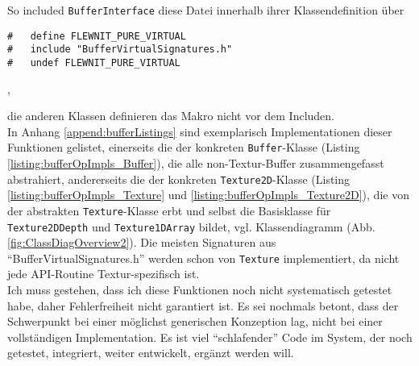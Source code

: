 	So included \lstinline|BufferInterface| diese Datei innerhalb ihrer Klassendefinition über
	\begin{lstlisting}
#	define FLEWNIT_PURE_VIRTUAL
#	include "BufferVirtualSignatures.h"
#	undef FLEWNIT_PURE_VIRTUAL
	\end{lstlisting},
	
	die anderen Klassen definieren das Makro nicht vor dem Includen.\\
	
	In Anhang \ref{append:bufferListings} sind exemplarisch Implementationen dieser Funktionen 
	gelistet, einerseits die der konkreten \lstinline|Buffer|-Klasse (Listing \ref{listing:bufferOpImpls_Buffer}),
	 die alle non-Textur-Buffer zusammengefasst abstrahiert, 
	andererseits die der konkreten \lstinline|Texture2D|-Klasse 
	(Listing \ref{listing:bufferOpImpls_Texture} und \ref{listing:bufferOpImpls_Texture2D}), 
	die von der abstrakten \lstinline|Texture|-Klasse erbt und selbst die Basisklasse für
	\lstinline|Texture2DDepth| und \lstinline|Texture1DArray| bildet, 
	vgl. Klassendiagramm (Abb. \ref{fig:ClassDiagOverview2}). Die meisten Signaturen aus "`BufferVirtualSignatures.h"'
	werden schon von \lstinline|Texture| implementiert, da nicht jede API-Routine Textur-spezifisch ist.\\
	Ich muss gestehen, dass ich diese Funktionen noch nicht systematisch getestet habe, daher Fehlerfreiheit nicht 
	garantiert ist. Es sei nochmals betont, dass der Schwerpunkt bei einer möglichst generischen Konzeption lag,
	nicht bei einer vollständigen Implementation. Es ist viel "`schlafender"' Code im System, der noch getestet, 
	integriert, weiter entwickelt, ergänzt werden will.
	
